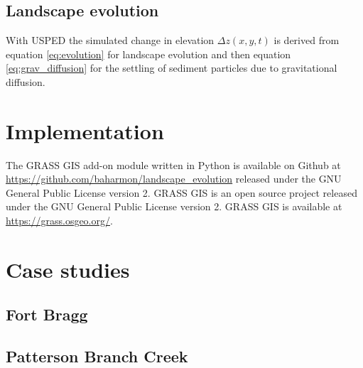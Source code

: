 \documentclass[final,3p,times,twocolumn]{elsarticle}
\begin{document}
\subsection{Landscape evolution}
With USPED the simulated change in elevation $\Delta z(x,y,t)$
is derived from equation \ref{eq:evolution} for landscape evolution
and then equation \ref{eq:grav_diffusion}
for the settling of sediment particles due to gravitational diffusion.

\clearpage
\section{Implementation}


The GRASS GIS add-on module written in Python
is available on Github at \url{https://github.com/baharmon/landscape_evolution} released under the GNU General Public License version 2. 
GRASS GIS is an open source project released under the GNU General Public License version 2. GRASS GIS is available at \url{https://grass.osgeo.org/}. 


\clearpage
\section{Case studies}
\subsection{Fort Bragg}
\subsection{Patterson Branch Creek}
\end{document}
